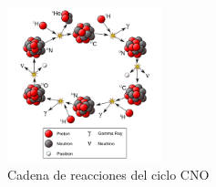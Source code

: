 \begin{figure}
	\centering
	\includegraphics[width=0.4\textwidth]{img/tesis/ciclo CNO.png}
	\caption {Cadena de reacciones del ciclo CNO}
	\label{fig:ciclo-cno}
\end{figure}


\endinput
